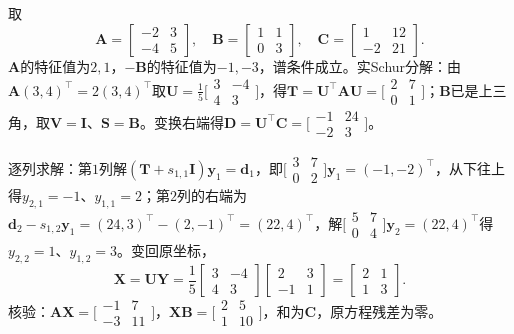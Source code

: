 \begin{example}
\label{ex:ls-bartels-stewart-2x2}
取
\[
 \bm A=\begin{bmatrix}-2&3\\-4&5\end{bmatrix},\quad
 \bm B=\begin{bmatrix}1&1\\0&3\end{bmatrix},\quad
 \bm C=\begin{bmatrix}1&12\\-2&21\end{bmatrix}.
\]
$\bm A$的特征值为$2,1$，$-\bm B$的特征值为$-1,-3$，谱条件成立。实Schur分解：由$\bm A(3,4)^\top=2(3,4)^\top$取$\bm U=\tfrac15\bigl[\begin{smallmatrix}3&-4\\4&3\end{smallmatrix}\bigr]$，得$\bm T=\bm U^\top\bm A\bm U=\bigl[\begin{smallmatrix}2&7\\0&1\end{smallmatrix}\bigr]$；$\bm B$已是上三角，取$\bm V=\bm I$、$\bm S=\bm B$。变换右端得$\bm D=\bm U^\top\bm C=\bigl[\begin{smallmatrix}-1&24\\-2&3\end{smallmatrix}\bigr]$。

逐列求解：第$1$列解$(\bm T+s_{1,1}\bm I)\bm y_1=\bm d_1$，即$\bigl[\begin{smallmatrix}3&7\\0&2\end{smallmatrix}\bigr]\bm y_1=(-1,-2)^\top$，从下往上得$y_{2,1}=-1$、$y_{1,1}=2$；第$2$列的右端为$\bm d_2-s_{1,2}\bm y_1=(24,3)^\top-(2,-1)^\top=(22,4)^\top$，解$\bigl[\begin{smallmatrix}5&7\\0&4\end{smallmatrix}\bigr]\bm y_2=(22,4)^\top$得$y_{2,2}=1$、$y_{1,2}=3$。变回原坐标，
\[
 \bm X=\bm U\bm Y=\frac15\begin{bmatrix}3&-4\\4&3\end{bmatrix}\begin{bmatrix}2&3\\-1&1\end{bmatrix}=\begin{bmatrix}2&1\\1&3\end{bmatrix}.
\]
核验：$\bm A\bm X=\bigl[\begin{smallmatrix}-1&7\\-3&11\end{smallmatrix}\bigr]$，$\bm X\bm B=\bigl[\begin{smallmatrix}2&5\\1&10\end{smallmatrix}\bigr]$，和为$\bm C$，原方程残差为零。
\end{example}

